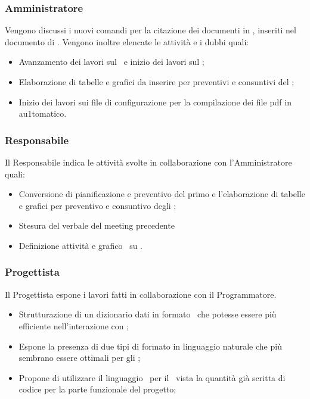 \subsubsection{Amministratore}
\par Vengono discussi i nuovi comandi per la citazione dei documenti in , inseriti nel documento di \NdP. Vengono inoltre elencate le attività e i dubbi quali:
\begin{itemize}
	\item Avanzamento dei lavori sul \PdP\ e inizio dei lavori sul \PdQ;
	\item Elaborazione di tabelle e grafici da inserire per preventivi e consuntivi del \PdP;
	\item Inizio dei lavori sui file di configurazione per la compilazione dei file pdf in au1tomatico.
\end{itemize}
\subsubsection{Responsabile} 
\par Il Responsabile indica le attività svolte in collaborazione con l'Amministratore quali:
\begin{itemize}
	\item Conversione di pianificazione e preventivo del primo  e l'elaborazione di tabelle e grafici per preventivo e consuntivo degli ; 
	\item Stesura del verbale del meeting precedente 
	\item Definizione attività e grafico \ su .
\end{itemize} 
\subsubsection{Progettista}
\par Il Progettista espone i lavori fatti in collaborazione con il Programmatore.
\begin{itemize}
	\item Strutturazione di un dizionario dati in formato \ che potesse essere più efficiente nell'interazione con ;
	\item Espone la presenza di due tipi di formato in linguaggio naturale che più sembrano essere ottimali per gli ;
	\item Propone di utilizzare il linguaggio \ per il \ vista la quantità già scritta di codice per la parte funzionale del progetto;
\end{itemize}

